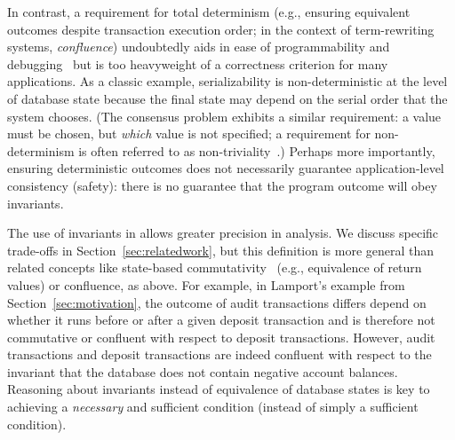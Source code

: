 In contrast, a requirement for total determinism (e.g., ensuring
equivalent outcomes despite transaction execution order; in the
context of term-rewriting systems, \textit{confluence}) undoubtedly
aids in ease of programmability and
debugging~\cite{blooml,calm,termrewriting} but is too heavyweight of a
correctness criterion for many applications. As a classic example,
serializability is non-deterministic at the level of database state
because the final state may depend on the serial order that the system
chooses. (The consensus problem exhibits a similar requirement: a
value must be chosen, but \textit{which} value is not specified; a
requirement for non-determinism is often referred to as
non-triviality~\cite{paxos-commit}.) Perhaps more importantly, ensuring
deterministic outcomes does not necessarily guarantee
application-level consistency (safety): there is no guarantee that the
program outcome will obey invariants.

The use of invariants in \iconfluence allows greater precision in
analysis. We discuss specific trade-offs in
Section~\ref{sec:relatedwork}, but this definition is more general
than related concepts like state-based
commutativity~\cite{weihl-thesis} (e.g., equivalence of return values)
or confluence, as above. For example, in Lamport's example from
Section~\ref{sec:motivation}, the outcome of audit transactions
differs depend on whether it runs before or after a given deposit
transaction and is therefore not commutative or confluent with respect
to deposit transactions. However, audit transactions and deposit
transactions are indeed confluent with respect to the invariant that
the database does not contain negative account balances. Reasoning
about invariants instead of equivalence of database states is key to
achieving a \textit{necessary} and sufficient condition (instead of
simply a sufficient condition).

